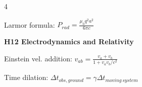 \documentclass[a4paper,twoside]{article}
\newcommand{\secblock}[1]{%
\par\vspace{1.8pt}%
\noindent\colorbox{hdrcol}{\parbox[c][1.0em][c]{0.98\linewidth}{\color{white}\bfseries\small #1}}\par
\vspace{1pt}%
}
\begin{document}
\begin{multicols*}{4}















Larmor formula:
\(P_{rad} = \frac{\mu_0 q^2 a^2}{6 \pi c}\)

\secblock{H12 Electrodynamics and Relativity}

Einstein vel. addition:
\(v_{ab} = \frac{v_a + v_b}{1 + v_a v_b/c^2}\)

Time dilation:
\(\Delta t_{obs, ground} = \gamma \Delta t_{moving\,system}\)


\end{multicols*}
\end{document}
